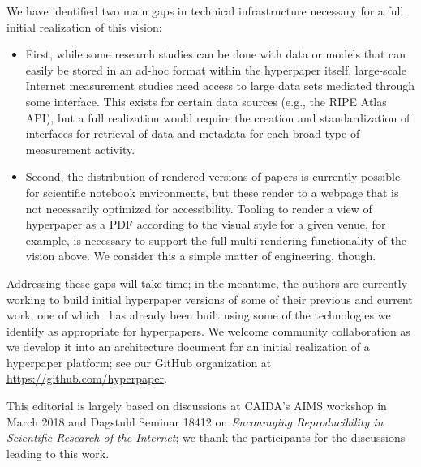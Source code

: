 \documentclass[sigconf]{acmart}
\begin{document}
We have identified two main gaps in technical infrastructure necessary for a
full initial realization of this vision:

\begin{itemize}
	
	\item First, while some research studies can be done with data or models
	that can easily be stored in an ad-hoc format within the hyperpaper itself,
	large-scale Internet measurement studies need access to large data sets
	mediated through some interface. This exists for certain data sources (e.g.,
	the RIPE Atlas API), but a full realization would require the creation and
	standardization of interfaces for retrieval of data and metadata for each
	broad type of measurement activity.

	\item Second, the distribution of rendered versions of papers is currently
	possible for scientific notebook environments, but these render to a webpage
	that is not necessarily optimized for accessibility. Tooling to render a
	view of hyperpaper as a PDF according to the visual style for a given venue,
	for example, is necessary to support the full multi-rendering functionality
	of the vision above. We consider this a simple matter of engineering,
	though.

\end{itemize}

Addressing these gaps will take time; in the meantime, the authors are currently
working to build initial hyperpaper versions of some of their previous and
current work, one of which~\cite{Trammell17} has already been built using some
of the technologies we identify as appropriate for hyperpapers. We welcome
community collaboration as we develop it into an architecture document for an
initial realization of a hyperpaper platform; see our GitHub organization at
\url{https://github.com/hyperpaper}.

\begin{acks}
	This editorial is largely based on discussions at CAIDA's AIMS workshop in
	March 2018 and Dagstuhl Seminar 18412 on \emph{Encouraging Reproducibility
	in Scientific Research of the Internet}; we thank the participants for the
	discussions leading to this work.
\end{acks}

{ \balance
{
	
	
}
}
\end{document}
